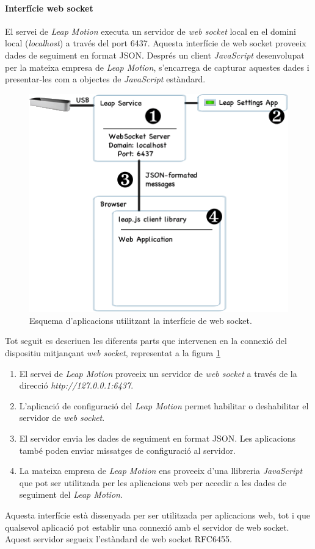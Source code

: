 \documentclass[12pt,a4paper,catalan]{article}
\begin{document}
	\paragraph{Interfície web socket}
	El servei de \textit{Leap Motion} executa un servidor de \textit{web socket} local en el domini local (\textit{localhost}) a través del port 6437. Aquesta interfície de web socket proveeix dades de seguiment en format JSON. Després un client \textit{JavaScript} desenvolupat per la mateixa empresa de \textit{Leap Motion}, s'encarrega de capturar aquestes dades i presentar-les com a objectes de \textit{JavaScript} estàndard.
	\begin{figure}[H]
		\includegraphics[width=\textwidth,keepaspectratio]{websocket-interface.png}
		\centering
		\caption{Esquema d'aplicacions utilitzant la interfície de web socket.}
		\label{fig:websocket-interface}
	\end{figure}
	Tot seguit es descriuen les diferents parts que intervenen en la connexió del dispositiu mitjançant \textit{web socket}, representat a la figura \ref{fig:websocket-interface}
	\begin{enumerate}
		\item El servei de \textit{Leap Motion} proveeix un servidor de \textit{web socket} a través de la direcció \textit{http://127.0.0.1:6437}.
		\item L'aplicació de configuració del \textit{Leap Motion} permet habilitar o deshabilitar el servidor de \textit{web socket}.
		\item El servidor envia les dades de seguiment en format JSON. Les aplicacions també poden enviar missatges de configuració al servidor.
		\item La mateixa empresa de \textit{Leap Motion} ens proveeix d'una llibreria \textit{JavaScript} que pot ser utilitzada per les aplicacions web per accedir a les dades de seguiment del \textit{Leap Motion}.
	\end{enumerate}
	Aquesta interfície està dissenyada per ser utilitzada per aplicacions web, tot i que qualsevol aplicació pot establir una connexió amb el servidor de web socket. Aquest servidor segueix l'estàndard de web socket RFC6455.
\end{document}
